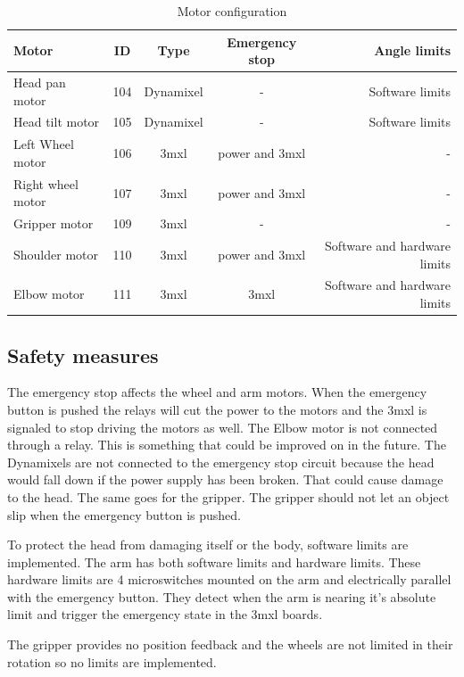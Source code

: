 \documentclass[technical_document.tex]{subfiles}
\begin{document}
\begin{table}[h]
\centering
  \begin{tabular}{| l | c | c | c | r |}
    \hline
    {\bf Motor} & {\bf ID} & {\bf Type} & {\bf Emergency stop} & {\bf Angle limits}	\\ \hline
    Head pan motor 	& 	104 & 	Dynamixel & -	& Software limits	\\ \hline
    Head tilt motor 	&	105 &	Dynamixel & -	& Software limits		\\ \hline
    Left Wheel motor   &	106 & 	3mxl &		power and 3mxl	& -	\\ \hline
    Right wheel motor &	107 & 	3mxl &		power and 3mxl	& -	\\ \hline
    Gripper motor	 & 	109 &	3mxl &		-	& -	\\ \hline
    Shoulder motor 	 &	110 &	3mxl &		power and 3mxl	& Software and hardware limits \\ \hline
    Elbow motor 		 &	111 &	3mxl &		3mxl	& Software and hardware limits	\\ 
    \hline
  \end{tabular}
\caption{Motor configuration}
\label{tab:motorConfiguration}
\end{table}



\newpage
\subsection{Safety measures}
The emergency stop affects the wheel and arm motors. When the emergency button is pushed the relays will cut the power to the motors and the 3mxl is signaled to stop driving the motors as well. The Elbow motor is not connected through a relay. This is something that could be improved on in the future.
The Dynamixels are not connected to the emergency stop circuit because the head would fall down if the power supply has been broken. That could cause damage to the head. The same goes for the gripper. The gripper should not let an object slip when the emergency button is pushed.

To protect the head from damaging itself or the body, software limits are implemented. The arm has both software limits and hardware limits. These hardware limits are 4 microswitches mounted on the arm and electrically parallel with the emergency button. They detect when the arm is nearing it's absolute limit and trigger the emergency state in the 3mxl boards.

The gripper provides no position feedback and the wheels are not limited in their rotation so no limits are implemented.
\end{document}
